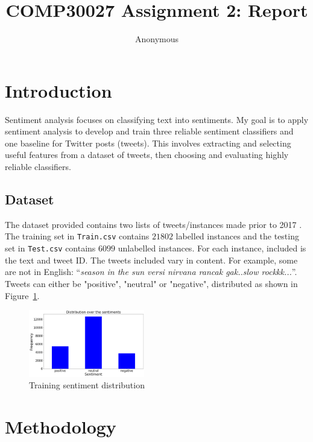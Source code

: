 \documentclass[11pt]{article}
\title{COMP30027 Assignment 2: Report}
\author
{Anonymous}
\begin{document}
\maketitle

\section{Introduction}\label{sec:intro}

Sentiment analysis focuses on classifying text into sentiments.
My goal is to apply sentiment analysis to develop and train three reliable sentiment classifiers and one baseline for {T}witter posts (tweets).
This involves extracting and selecting useful features from a dataset of tweets, 
then choosing and evaluating highly reliable classifiers.

\subsection{Dataset}\label{sec:dataset}

The dataset provided contains two lists of tweets/instances made prior to 2017 \cite{dataset}.
The training set in \texttt{Train.csv} contains $21802$ labelled instances and the testing set in \texttt{Test.csv} contains $6099$ unlabelled instances. 
For each instance, included is the text and tweet ID. 
The tweets included vary in content.
For example, some are not in English: ``\textit{season in the sun versi nirvana rancak gak..slow rockkk...}''.
Tweets can either be "positive", "neutral" or "negative", distributed as shown in Figure~\ref{fig:sent-dist}.

\begin{figure}[H]
	\centering
	\includegraphics[width = 0.45\textwidth]{sentiment-distribution.png}
	\caption{Training sentiment distribution}
	\label{fig:sent-dist}
\end{figure} 

\section{Methodology}
\end{document}
